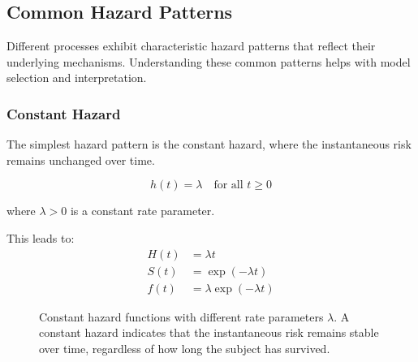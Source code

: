 \subsection{Common Hazard Patterns}

Different processes exhibit characteristic hazard patterns that reflect their underlying mechanisms. Understanding these common patterns helps with model selection and interpretation.

\subsubsection{Constant Hazard}

The simplest hazard pattern is the constant hazard, where the instantaneous risk remains unchanged over time.

\begin{equationbox}[title=Constant Hazard Function]
\begin{equation}
    h(t) = \lambda \quad \text{for all } t \geq 0
\end{equation}

where $\lambda > 0$ is a constant rate parameter.

This leads to:
\begin{align}
    H(t) &= \lambda t\\
    S(t) &= \exp(-\lambda t)\\
    f(t) &= \lambda \exp(-\lambda t)
\end{align}
\end{equationbox}

\begin{figure}[htbp]
    \centering
    \caption{Constant hazard functions with different rate parameters $\lambda$. A constant hazard indicates that the instantaneous risk remains stable over time, regardless of how long the subject has survived.}
    \label{fig:constant-hazard-rates}
\end{figure}


